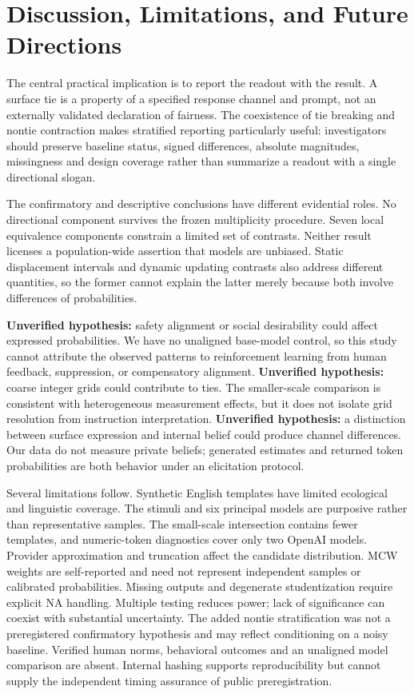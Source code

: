 \documentclass[11pt]{article}
\begin{document}
\section{Discussion, Limitations, and Future Directions}
The central practical implication is to report the readout with the result. A surface tie is a property of a specified response channel and prompt, not an externally validated declaration of fairness. The coexistence of tie breaking and nontie contraction makes stratified reporting particularly useful: investigators should preserve baseline status, signed differences, absolute magnitudes, missingness and design coverage rather than summarize a readout with a single directional slogan.

The confirmatory and descriptive conclusions have different evidential roles. No directional component survives the frozen multiplicity procedure. Seven local equivalence components constrain a limited set of contrasts. Neither result licenses a population-wide assertion that models are unbiased. Static displacement intervals and dynamic updating contrasts also address different quantities, so the former cannot explain the latter merely because both involve differences of probabilities.

\textbf{Unverified hypothesis:} safety alignment or social desirability could affect expressed probabilities. We have no unaligned base-model control, so this study cannot attribute the observed patterns to reinforcement learning from human feedback, suppression, or compensatory alignment. \textbf{Unverified hypothesis:} coarse integer grids could contribute to ties. The smaller-scale comparison is consistent with heterogeneous measurement effects, but it does not isolate grid resolution from instruction interpretation. \textbf{Unverified hypothesis:} a distinction between surface expression and internal belief could produce channel differences. Our data do not measure private beliefs; generated estimates and returned token probabilities are both behavior under an elicitation protocol.

Several limitations follow. Synthetic English templates have limited ecological and linguistic coverage. The stimuli and six principal models are purposive rather than representative samples. The small-scale intersection contains fewer templates, and numeric-token diagnostics cover only two OpenAI models. Provider approximation and truncation affect the candidate distribution. MCW weights are self-reported and need not represent independent samples or calibrated probabilities. Missing outputs and degenerate studentization require explicit NA handling. Multiple testing reduces power; lack of significance can coexist with substantial uncertainty. The added nontie stratification was not a preregistered confirmatory hypothesis and may reflect conditioning on a noisy baseline. Verified human norms, behavioral outcomes and an unaligned model comparison are absent. Internal hashing supports reproducibility but cannot supply the independent timing assurance of public preregistration.
\end{document}
